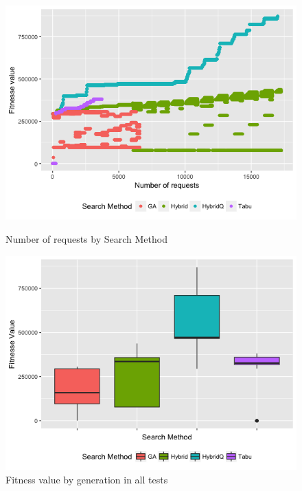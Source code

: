 \begin{figure}[h]
\begin{minipage}{.5\textwidth}
\centering
\includegraphics[width=1\textwidth]{./images/experiment2-1.png}
\caption{Number of requests by Search Method}
\label{fig:numberofrequestsbysearchmethod2}
\end{minipage}
\begin{minipage}{.5\textwidth}
\centering
\includegraphics[width=1\textwidth]{./images/experiment2-2.png}
\caption{Fitness value by generation in all tests}
\label{fig:boxplot2}
\end{minipage}

\end{figure}



